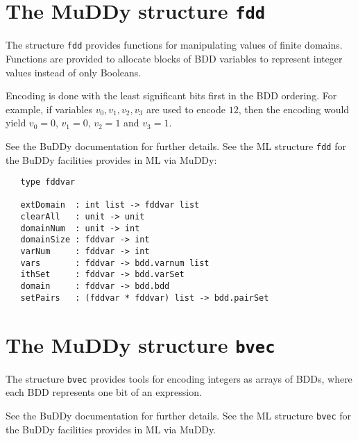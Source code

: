 \documentclass[12pt]{article}
\renewcommand{\t}[1]{\mbox{\tt #1}}
\newcommand{\Buddy}{BuDDy\xspace}
\newcommand{\Muddy}{MuDDy\xspace}
\begin{document}
\section{The \Muddy{} structure \t{fdd}}\label{fdd}

The structure \t{fdd} provides functions for manipulating values of finite domains.
Functions are provided to allocate blocks of BDD variables to represent integer values instead
of only Booleans.

Encoding is done with the least significant bits first in the BDD ordering. For example, if variables
$v_0, v_1, v_2, v_3$ are used to encode $12$, then the encoding would yield
$v_0=0$, $v_1=0$, $v_2=1$ and $v_3=1$.

See the \Buddy{} documentation \cite{BuDDy} for further details. See the ML structure \t{fdd}
for the \Buddy{} facilities provides in ML via \Muddy:

{\tiny\begin{verbatim}
   type fddvar

   extDomain  : int list -> fddvar list
   clearAll   : unit -> unit
   domainNum  : unit -> int
   domainSize : fddvar -> int
   varNum     : fddvar -> int
   vars       : fddvar -> bdd.varnum list
   ithSet     : fddvar -> bdd.varSet
   domain     : fddvar -> bdd.bdd
   setPairs   : (fddvar * fddvar) list -> bdd.pairSet
\end{verbatim}}

\section{The \Muddy{} structure \t{bvec}}\label{bvec}

The structure \t{bvec} provides tools for encoding integers as arrays
of BDDs, where each BDD represents one bit of an expression.

See the \Buddy{} documentation \cite{BuDDy} for further details. See the ML structure \t{bvec}
for the \Buddy{} facilities provides in ML via \Muddy{}.
\end{document}
